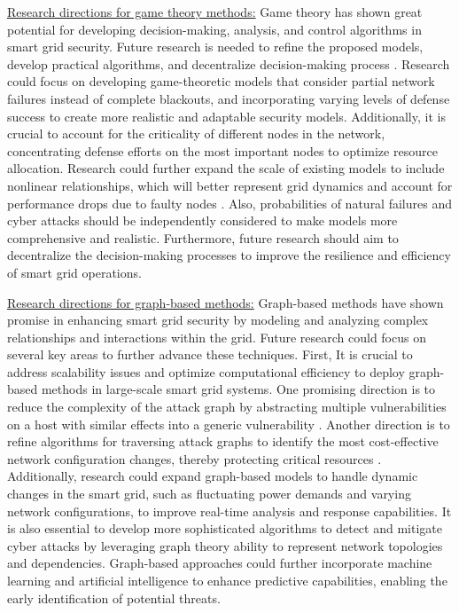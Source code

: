 \documentclass[10pt, journal]{IEEEtran}
\begin{document}
\underline{Research directions for game theory methods:} Game theory has shown great potential for developing decision-making, analysis, and control algorithms in smart grid security. Future research is needed to refine the proposed models, develop practical algorithms, and decentralize decision-making process \cite{alpcan2003game}. Research could focus on developing game-theoretic models that consider partial network failures instead of complete blackouts, and incorporating varying levels of defense success to create more realistic and adaptable security models. Additionally, it is crucial to account for the criticality of different nodes in the network, concentrating defense efforts on the most important nodes to optimize resource allocation. Research could further expand the scale of existing models to include nonlinear relationships, which will better represent grid dynamics and account for performance drops due to faulty nodes \cite{shan2020game}. Also, probabilities of natural failures and cyber attacks should be independently considered to make models more comprehensive and realistic. Furthermore, future research should aim to decentralize the decision-making processes to improve the resilience and efficiency of smart grid operations.

\underline{Research directions for graph-based methods:} Graph-based methods have shown promise in enhancing smart grid security by modeling and analyzing complex relationships and interactions within the grid. Future research could focus on several key areas to further advance these techniques. First, It is crucial to address scalability issues and optimize computational efficiency to deploy graph-based methods in large-scale smart grid systems. One promising direction is to reduce the complexity of the attack graph by abstracting multiple vulnerabilities on a host with similar effects into a generic vulnerability \cite{ammann2002scalable}.
Another direction is to refine algorithms for traversing attack graphs to identify the most cost-effective network configuration changes, thereby protecting critical resources \cite{wang2006minimum}. Additionally, research could expand graph-based models to handle dynamic changes in the smart grid, such as fluctuating power demands and varying network configurations, to improve real-time analysis and response capabilities. It is also essential to develop more sophisticated algorithms to detect and mitigate cyber attacks by leveraging graph theory ability to represent network topologies and dependencies. Graph-based approaches could further incorporate machine learning and artificial intelligence to enhance predictive capabilities, enabling the early identification of potential threats.
 
\end{document}
